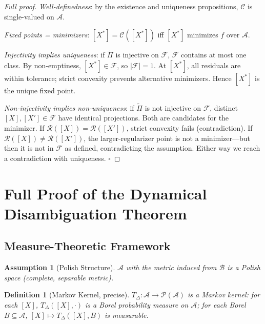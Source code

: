 \documentclass[12pt, oneside]{article}
\newtheorem{definition}[theorem]{Definition}
\newtheorem{assumption}[theorem]{Assumption}
\newcommand{\Ftil}{\widetilde{\Pi}}
\begin{document}
\begin{proof}[Full proof]
\textit{Well-definedness}: by the existence and uniqueness propositions, $\mathcal{C}$ is
single-valued on $\mathcal{A}$.

\textit{Fixed points = minimizers}: $[X^*] = \mathcal{C}([X^*])$ iff $[X^*]$ minimizes
$f$ over $\mathcal{A}$.

\textit{Injectivity implies uniqueness}: if $\Ftil$ is injective on $\mathcal{F}$,
$\mathcal{F}$ contains at most one class. By non-emptiness, $[X^*] \in \mathcal{F}$, so
$|\mathcal{F}| = 1$. At $[X^*]$, all residuals are within tolerance; strict convexity
prevents alternative minimizers. Hence $[X^*]$ is the unique fixed point.

\textit{Non-injectivity implies non-uniqueness}: if $\Ftil$ is not injective on
$\mathcal{F}$, distinct $[X],[X'] \in \mathcal{F}$ have identical projections. Both are
candidates for the minimizer. If $\mathcal{R}([X]) = \mathcal{R}([X'])$, strict
convexity fails (contradiction). If $\mathcal{R}([X]) \ne \mathcal{R}([X'])$, the
larger-regularizer point is not a minimizer---but then it is not in $\mathcal{F}$ as
defined, contradicting the assumption. Either way we reach a contradiction with
uniqueness. $\square$
\end{proof}

\section{Full Proof of the Dynamical Disambiguation Theorem}
\label{app:disambiguation}

\subsection{Measure-Theoretic Framework}

\begin{assumption}[Polish Structure]
$\mathcal{A}$ with the metric induced from $\mathcal{B}$ is a Polish space (complete,
separable metric).
\end{assumption}

\begin{definition}[Markov Kernel, precise]
$T_\Delta : \mathcal{A} \to \mathcal{P}(\mathcal{A})$ is a Markov kernel: for each
$[X]$, $T_\Delta([X],\cdot)$ is a Borel probability measure on $\mathcal{A}$; for each
Borel $B \subseteq \mathcal{A}$, $[X] \mapsto T_\Delta([X],B)$ is measurable.
\end{definition}
\end{document}
